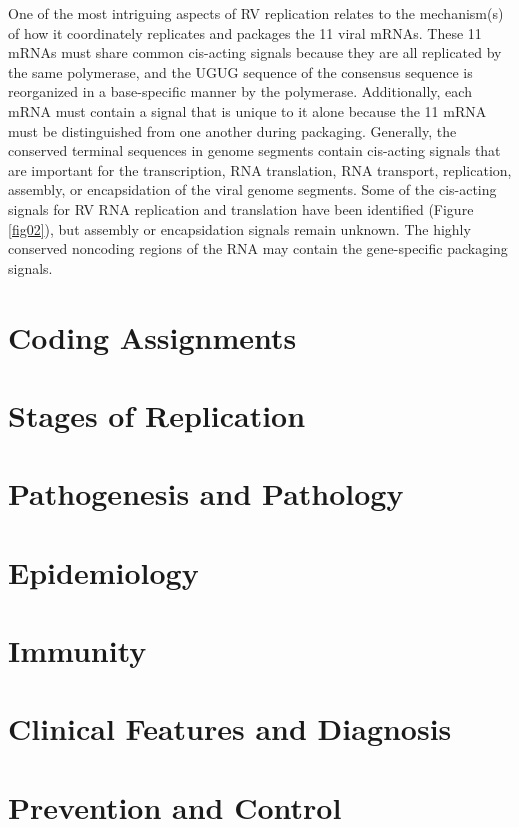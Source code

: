 One of the most intriguing aspects of RV replication relates to the mechanism(s) of how it coordinately replicates and packages the 11 viral mRNAs. These 11 mRNAs must share common cis-acting signals because they are all replicated by the same polymerase, and the UGUG sequence of the consensus sequence is reorganized in a base-specific manner by the polymerase. Additionally, each mRNA must contain a signal that is unique to it alone because the 11 mRNA must be distinguished from one another during packaging. Generally, the conserved terminal sequences in genome segments contain cis-acting signals that are important for the transcription, RNA translation, RNA transport, replication, assembly, or encapsidation of the viral genome segments. Some of the cis-acting signals for RV RNA replication and translation have been identified (Figure \ref{fig02}), but assembly or encapsidation signals remain unknown. The highly conserved noncoding regions of the RNA may contain the gene-specific packaging signals.

\section{Coding Assignments}

\section{Stages of Replication}

\section{Pathogenesis and Pathology}

\section{Epidemiology}

\section{Immunity}

\section{Clinical Features and Diagnosis}

\section{Prevention and Control}